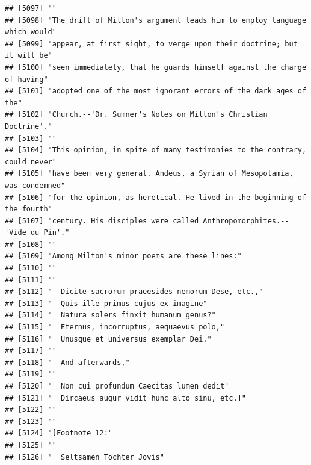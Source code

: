 \documentclass{article}\usepackage[]{graphicx}\usepackage[]{color}
\makeatletter
\newenvironment{kframe}{%
 \def\at@end@of@kframe{}%
 \ifinner\ifhmode%
  \def\at@end@of@kframe{\end{minipage}}%
  \begin{minipage}{\columnwidth}%
 \fi\fi%
 \def\FrameCommand##1{\hskip\@totalleftmargin \hskip-\fboxsep
 \colorbox{shadecolor}{##1}\hskip-\fboxsep
     \hskip-\linewidth \hskip-\@totalleftmargin \hskip\columnwidth}%
 \MakeFramed {\advance\hsize-\width
   \@totalleftmargin\z@ \linewidth\hsize
   \@setminipage}}%
 {\par\unskip\endMakeFramed%
 \at@end@of@kframe}
\newenvironment{knitrout}{}{} %
\makeatother
\begin{document}
\begin{knitrout}
\begin{kframe}
\begin{verbatim}
## [5097] ""                                                                            
## [5098] "The drift of Milton's argument leads him to employ language which would"     
## [5099] "appear, at first sight, to verge upon their doctrine; but it will be"        
## [5100] "seen immediately, that he guards himself against the charge of having"       
## [5101] "adopted one of the most ignorant errors of the dark ages of the"             
## [5102] "Church.--'Dr. Sumner's Notes on Milton's Christian Doctrine'."               
## [5103] ""                                                                            
## [5104] "This opinion, in spite of many testimonies to the contrary, could never"     
## [5105] "have been very general. Andeus, a Syrian of Mesopotamia, was condemned"      
## [5106] "for the opinion, as heretical. He lived in the beginning of the fourth"      
## [5107] "century. His disciples were called Anthropomorphites.--'Vide du Pin'."       
## [5108] ""                                                                            
## [5109] "Among Milton's minor poems are these lines:"                                 
## [5110] ""                                                                            
## [5111] ""                                                                            
## [5112] "  Dicite sacrorum praeesides nemorum Dese, etc.,"                            
## [5113] "  Quis ille primus cujus ex imagine"                                         
## [5114] "  Natura solers finxit humanum genus?"                                       
## [5115] "  Eternus, incorruptus, aequaevus polo,"                                     
## [5116] "  Unusque et universus exemplar Dei."                                        
## [5117] ""                                                                            
## [5118] "--And afterwards,"                                                           
## [5119] ""                                                                            
## [5120] "  Non cui profundum Caecitas lumen dedit"                                    
## [5121] "  Dircaeus augur vidit hunc alto sinu, etc.]"                                
## [5122] ""                                                                            
## [5123] ""                                                                            
## [5124] "[Footnote 12:"                                                               
## [5125] ""                                                                            
## [5126] "  Seltsamen Tochter Jovis"                                                   

\end{verbatim}
\end{kframe}
\end{knitrout}
\end{document}
